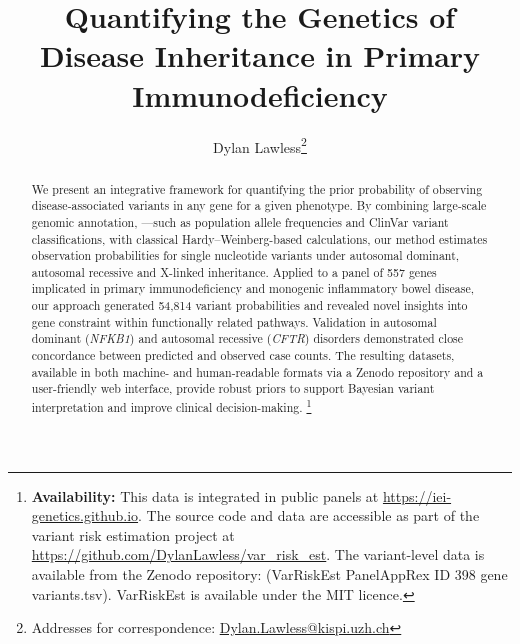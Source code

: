 
\usepackage[printonlyused,withpage,nohyperlinks]{acronym}
\usepackage{tikz}
\usetikzlibrary{calc}
\usepackage{amsmath, amssymb}


\title{Quantifying the Genetics of Disease Inheritance in Primary Immunodeficiency}

\author[1]{Dylan Lawless\thanks{Addresses for correspondence: \href{mailto:Dylan.Lawless@kispi.uzh.ch}{Dylan.Lawless@kispi.uzh.ch}}}

\maketitle
\justify



\begin{abstract}
We present an integrative framework for quantifying the prior probability of observing disease‐associated variants in any gene for a given phenotype. By combining large‐scale genomic annotation, —such as population allele frequencies and ClinVar variant classifications, with classical Hardy–Weinberg-based calculations, our method estimates observation probabilities for single nucleotide variants under autosomal dominant, autosomal recessive and X-linked inheritance. 
Applied to a panel of 557 genes implicated in primary immunodeficiency and monogenic inflammatory bowel disease, our approach generated 54,814 variant probabilities and revealed novel insights into gene constraint within functionally related pathways. 
Validation in autosomal dominant (\textit{NFKB1}) and autosomal recessive (\textit{CFTR}) disorders demonstrated close concordance between predicted and observed case counts. 
The resulting datasets, available in both machine- and human-readable formats via a Zenodo repository and a user-friendly web interface, provide robust priors to support Bayesian variant interpretation and improve clinical decision-making.
\footnote{
\noindent \textbf{Availability:} This data is integrated in public panels at 
\url{https://iei-genetics.github.io}.
The source code and data are accessible as part of the variant risk estimation project at \url{https://github.com/DylanLawless/var_risk_est}.
The variant-level data is available from the Zenodo repository:
(VarRiskEst PanelAppRex ID 398 gene variants.tsv).
VarRiskEst is available under the MIT licence.}
\end{abstract}

